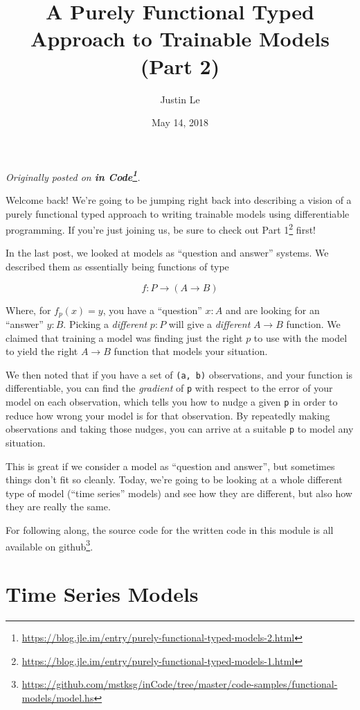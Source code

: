 \documentclass[]{article}
\title{A Purely Functional Typed Approach to Trainable Models (Part 2)}
\author{Justin Le}
\date{May 14, 2018}
\renewcommand{\href}[2]{#2\footnote{\url{#1}}}
\begin{document}
\maketitle

\emph{Originally posted on
\textbf{\href{https://blog.jle.im/entry/purely-functional-typed-models-2.html}{in
Code}}.}

Welcome back! We're going to be jumping right back into describing a vision of a
purely functional typed approach to writing trainable models using
differentiable programming. If you're just joining us, be sure to check out
\href{https://blog.jle.im/entry/purely-functional-typed-models-1.html}{Part 1}
first!

In the last post, we looked at models as ``question and answer'' systems. We
described them as essentially being functions of type

\[
f : P \rightarrow (A \rightarrow B)
\]

Where, for \(f_p(x) = y\), you have a ``question'' \(x : A\) and are looking for
an ``answer'' \(y : B\). Picking a \emph{different} \(p : P\) will give a
\emph{different} \(A \rightarrow B\) function. We claimed that training a model
was finding just the right \(p\) to use with the model to yield the right
\(A \rightarrow B\) function that models your situation.

We then noted that if you have a set of \texttt{(a,\ b)} observations, and your
function is differentiable, you can find the \emph{gradient} of \texttt{p} with
respect to the error of your model on each observation, which tells you how to
nudge a given \texttt{p} in order to reduce how wrong your model is for that
observation. By repeatedly making observations and taking those nudges, you can
arrive at a suitable \texttt{p} to model any situation.

This is great if we consider a model as ``question and answer'', but sometimes
things don't fit so cleanly. Today, we're going to be looking at a whole
different type of model (``time series'' models) and see how they are different,
but also how they are really the same.

For following along, the source code for the written code in this module is all
available
\href{https://github.com/mstksg/inCode/tree/master/code-samples/functional-models/model.hs}{on
github}.

\hypertarget{time-series-models}{%
\section{Time Series Models}\label{time-series-models}}
\end{document}
